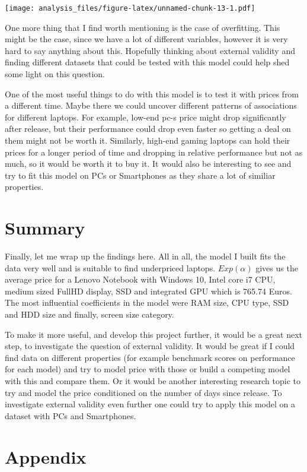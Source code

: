 \documentclass[
]{article}
\begin{document}
\texttt{[image: analysis\_files/figure-latex/unnamed-chunk-13-1.pdf]}

One more thing that I find worth mentioning is the case of overfitting.
This might be the case, since we have a lot of different variables,
however it is very hard to say anything about this. Hopefully thinking
about external validity and finding different datasets that could be
tested with this model could help shed some light on this question.

One of the most useful things to do with this model is to test it with
prices from a different time. Maybe there we could uncover different
patterns of associations for different laptops. For example, low-end
pc-s price might drop significantly after release, but their performance
could drop even faster so getting a deal on them might not be worth it.
Similarly, high-end gaming laptops can hold their prices for a longer
period of time and dropping in relative performance but not as much, so
it would be worth it to buy it. It would also be interesting to see and
try to fit this model on PCs or Smartphones as they share a lot of
similiar properties.

\hypertarget{summary}{%
\section{Summary}\label{summary}}

Finally, let me wrap up the findings here. All in all, the model I built
fits the data very well and is suitable to find underpriced laptops.
\(Exp(\alpha)\) gives us the average price for a Lenovo Notebook with
Windows 10, Intel core i7 CPU, medium sized FullHD display, SSD and
integrated GPU which is 765.74 Euros. The most influential coefficients
in the model were RAM size, CPU type, SSD and HDD size and finally,
screen size category.

To make it more useful, and develop this project further, it would be a
great next step, to investigate the question of external validity. It
would be great if I could find data on different properties (for example
benchmark scores on performance for each model) and try to model price
with those or build a competing model with this and compare them. Or it
would be another interesting research topic to try and model the price
conditioned on the number of days since release. To investigate external
validity even further one could try to apply this model on a dataset
with PCs and Smartphones.

\hypertarget{appendix}{%
\section{Appendix}\label{appendix}}
\end{document}
